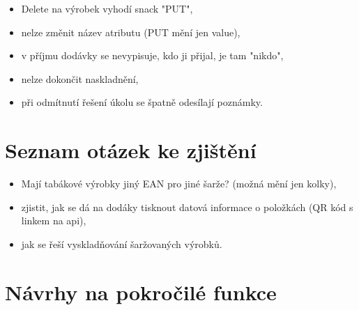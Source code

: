 \begin{itemize}
	\item Delete na výrobek vyhodí snack "PUT",
	\item nelze změnit název atributu (PUT mění jen value),
	\item v příjmu dodávky se nevypisuje, kdo ji přijal, je tam "nikdo",
	\item nelze dokončit naskladnění,
	\item při odmítnutí řešení úkolu se špatně odesílají poznámky.
\end{itemize}

\section{Seznam otázek ke zjištění}

\begin{itemize}
	\item Mají tabákové výrobky jiný EAN pro jiné šarže? (možná mění jen kolky),
	\item zjistit, jak se dá na dodáky tisknout datová informace o položkách (QR kód s linkem na api),
	\item jak se řeší vyskladňování šaržovaných výrobků.
\end{itemize}

\section{Návrhy na pokročilé funkce}


